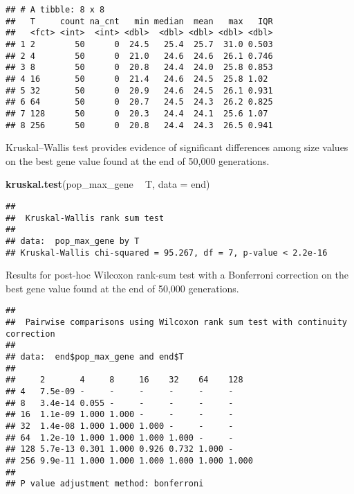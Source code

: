 \documentclass[]{book}
\newenvironment{Shaded}{\begin{snugshade}}{\end{snugshade}}
\newcommand{\DataTypeTok}[1]{\textcolor[rgb]{0.13,0.29,0.53}{#1}}
\newcommand{\KeywordTok}[1]{\textcolor[rgb]{0.13,0.29,0.53}{\textbf{#1}}}
\newcommand{\NormalTok}[1]{#1}
\newcommand{\OperatorTok}[1]{\textcolor[rgb]{0.81,0.36,0.00}{\textbf{#1}}}
\newcommand{\OtherTok}[1]{\textcolor[rgb]{0.56,0.35,0.01}{#1}}
\newcommand{\StringTok}[1]{\textcolor[rgb]{0.31,0.60,0.02}{#1}}
\begin{document}
\begin{verbatim}
## # A tibble: 8 x 8
##   T     count na_cnt   min median  mean   max   IQR
##   <fct> <int>  <int> <dbl>  <dbl> <dbl> <dbl> <dbl>
## 1 2        50      0  24.5   25.4  25.7  31.0 0.503
## 2 4        50      0  21.0   24.6  24.6  26.1 0.746
## 3 8        50      0  20.8   24.4  24.0  25.8 0.853
## 4 16       50      0  21.4   24.6  24.5  25.8 1.02 
## 5 32       50      0  20.9   24.6  24.5  26.1 0.931
## 6 64       50      0  20.7   24.5  24.3  26.2 0.825
## 7 128      50      0  20.3   24.4  24.1  25.6 1.07 
## 8 256      50      0  20.8   24.4  24.3  26.5 0.941
\end{verbatim}

Kruskal--Wallis test provides evidence of significant differences among size values on the best gene value found at the end of 50,000 generations.

\begin{Shaded}
\begin{Highlighting}[]
\KeywordTok{kruskal.test}\NormalTok{(pop_max_gene }\OperatorTok{~}\StringTok{ }\NormalTok{T, }\DataTypeTok{data =}\NormalTok{ end)}
\end{Highlighting}
\end{Shaded}

\begin{verbatim}
## 
##  Kruskal-Wallis rank sum test
## 
## data:  pop_max_gene by T
## Kruskal-Wallis chi-squared = 95.267, df = 7, p-value < 2.2e-16
\end{verbatim}

Results for post-hoc Wilcoxon rank-sum test with a Bonferroni correction on the best gene value found at the end of 50,000 generations.

\begin{Shaded}
\end{Shaded}

\begin{verbatim}
## 
##  Pairwise comparisons using Wilcoxon rank sum test with continuity correction 
## 
## data:  end$pop_max_gene and end$T 
## 
##     2       4     8     16    32    64    128  
## 4   7.5e-09 -     -     -     -     -     -    
## 8   3.4e-14 0.055 -     -     -     -     -    
## 16  1.1e-09 1.000 1.000 -     -     -     -    
## 32  1.4e-08 1.000 1.000 1.000 -     -     -    
## 64  1.2e-10 1.000 1.000 1.000 1.000 -     -    
## 128 5.7e-13 0.301 1.000 0.926 0.732 1.000 -    
## 256 9.9e-11 1.000 1.000 1.000 1.000 1.000 1.000
## 
## P value adjustment method: bonferroni
\end{verbatim}
\end{document}
